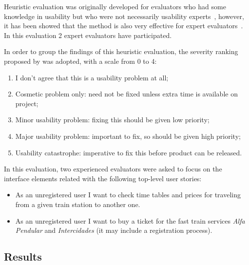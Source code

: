 \documentclass[a4paper]{article}
\begin{document}
Heuristic evaluation was originally developed for evaluators who had some knowledge in usability but who were not necessarily usability experts~\citep{nielsen1990heuristic}, 
however, it has been showed that the method is also very effective for expert evaluators~\citep{nielsen1992finding}. In this evaluation 2 expert evaluators have participated.

In order to group the findings of this heuristic evaluation, the severity ranking proposed by \citet{nielsen1995rating} was adopted, with a scale from 0 to 4:

\begin{enumerate}[start=0, label={\theenumi{} -}]
\item I don't agree that this is a usability problem at all;
\item Cosmetic problem only: need not be fixed unless extra time is available on project;
\item Minor usability problem: fixing this should be given low priority;
\item Major usability problem: important to fix, so should be given high priority;
\item Usability catastrophe: imperative to fix this before product can be released.
\end{enumerate}

In this evaluation, two experienced evaluators were asked to focus on the interface elements related with the following top-level user stories:
\begin{itemize}
  \item As an unregistered user I want to check time tables and prices for traveling from a given train station to another one.
  \item As an unregistered user I want to buy a ticket for the fast train services \textit{Alfa Pendular} and \textit{Intercidades} (it may include a registration process).
\end{itemize}

\subsection{Results}
\end{document}
